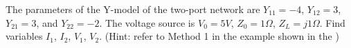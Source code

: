 
% 

\item The parameters of the Y-model of the two-port network are $Y_{11}=-4$, 
$Y_{12}=3$, $Y_{21}=3$, and $Y_{22}=-2$. The voltage source is $V_0=5V$, 
$Z_0=1\Omega$, $Z_L=j1\Omega$. Find variables $I_1$, $I_2$, $V_1$, $V_2$. 
(Hint: refer to Method 1 in the example shown in the
)


